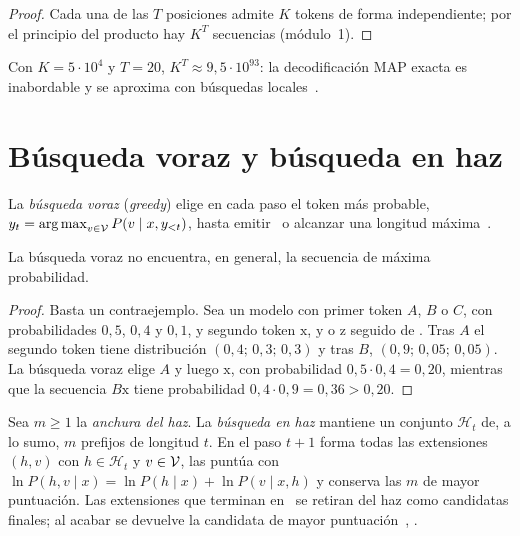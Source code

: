\begin{proof}
Cada una de las $T$ posiciones admite $K$ tokens de forma independiente; por el principio del producto hay $K^{T}$ secuencias (módulo~1).
\end{proof}

Con $K=5\cdot 10^{4}$ y $T=20$, $K^{T}\approx 9{,}5\cdot 10^{93}$: la decodificación MAP exacta es inabordable y se aproxima con búsquedas locales~\cite[§10.8.2]{d2l}.

\section{Búsqueda voraz y búsqueda en haz}

\begin{definicion}
La \emph{búsqueda voraz} (\emph{greedy}) elige en cada paso el token más probable, $y_t=\operatorname*{arg\,max}_{v\in\mathcal{V}}P(v\mid x,y_{<t})$, hasta emitir \fin\ o alcanzar una longitud máxima~\cite[§7.6.1]{jm3}.
\end{definicion}

\begin{proposicion}\label{prop:voraz-no-optima}
La búsqueda voraz no encuentra, en general, la secuencia de máxima probabilidad.
\end{proposicion}

\begin{proof}
Basta un contraejemplo. Sea un modelo con primer token $A$, $B$ o $C$, con probabilidades $0{,}5$, $0{,}4$ y $0{,}1$, y segundo token $\mathrm{x}$, $\mathrm{y}$ o $\mathrm{z}$ seguido de \fin. Tras $A$ el segundo token tiene distribución $(0{,}4;\allowbreak\,0{,}3;\allowbreak\,0{,}3)$ y tras $B$, $(0{,}9;\allowbreak\,0{,}05;\allowbreak\,0{,}05)$. La búsqueda voraz elige $A$ y luego $\mathrm{x}$, con probabilidad $0{,}5\cdot 0{,}4=0{,}20$, mientras que la secuencia $B\mathrm{x}$ tiene probabilidad $0{,}4\cdot 0{,}9=0{,}36>0{,}20$.
\end{proof}

\begin{definicion}\label{def:haz}
Sea $m\ge 1$ la \emph{anchura del haz}. La \emph{búsqueda en haz} mantiene un conjunto $\mathcal{H}_t$ de, a lo sumo, $m$ prefijos de longitud $t$. En el paso $t+1$ forma todas las extensiones $(h,v)$ con $h\in\mathcal{H}_t$ y $v\in\mathcal{V}$, las puntúa con $\ln P(h,v\mid x)=\ln P(h\mid x)+\ln P(v\mid x,h)$ y conserva las $m$ de mayor puntuación. Las extensiones que terminan en \fin\ se retiran del haz como candidatas finales; al acabar se devuelve la candidata de mayor puntuación~\cite[§13.4]{jm3}, \cite[§10.8.3]{d2l}.
\end{definicion}

